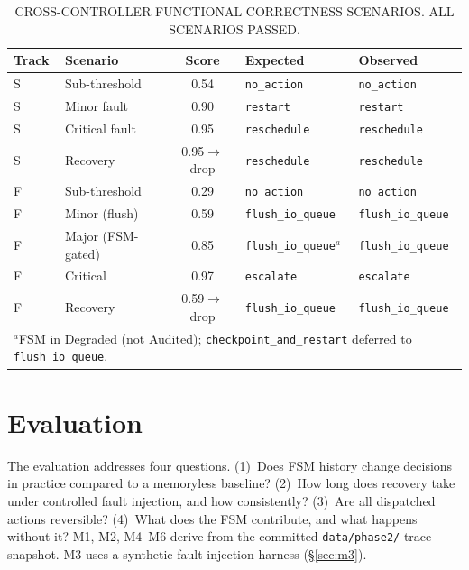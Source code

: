 \documentclass[conference]{IEEEtran}
\begin{document}
\begin{table}[!t]
\caption{CROSS-CONTROLLER FUNCTIONAL CORRECTNESS SCENARIOS. ALL SCENARIOS PASSED.}
\label{tab:scenarios}
\centering
\renewcommand{\arraystretch}{1.20}
\setlength{\tabcolsep}{7pt}
\begin{tabular}{llcll}
\hline
\textbf{Track} & \textbf{Scenario} & \textbf{Score} & \textbf{Expected} & \textbf{Observed} \\
\hline
S & Sub-threshold     & 0.54                  & \texttt{no\_action}           & \texttt{no\_action} \\
S & Minor fault       & 0.90                  & \texttt{restart}              & \texttt{restart} \\
S & Critical fault    & 0.95                  & \texttt{reschedule}           & \texttt{reschedule} \\
S & Recovery          & 0.95$\rightarrow$drop & \texttt{reschedule}           & \texttt{reschedule} \\
F & Sub-threshold     & 0.29                  & \texttt{no\_action}           & \texttt{no\_action} \\
F & Minor (flush)     & 0.59                  & \texttt{flush\_io\_queue}     & \texttt{flush\_io\_queue} \\
F & Major (FSM-gated) & 0.85                  & \texttt{flush\_io\_queue}$^{a}$ & \texttt{flush\_io\_queue} \\
F & Critical          & 0.97                  & \texttt{escalate}             & \texttt{escalate} \\
F & Recovery          & 0.59$\rightarrow$drop & \texttt{flush\_io\_queue}     & \texttt{flush\_io\_queue} \\
\hline
\multicolumn{5}{l}{\footnotesize $^{a}$FSM in Degraded (not Audited); \texttt{checkpoint\_and\_restart} deferred to \texttt{flush\_io\_queue}.}
\end{tabular}
\end{table}

\section{Evaluation}
\label{sec:eval}

The evaluation addresses four questions. (1)~Does FSM history change decisions in practice compared to a memoryless baseline? (2)~How long does recovery take under controlled fault injection, and how consistently? (3)~Are all dispatched actions reversible? (4)~What does the FSM contribute, and what happens without it? M1, M2, M4--M6 derive from the committed \texttt{data/phase2/} trace snapshot. M3 uses a synthetic fault-injection harness (§\ref{sec:m3}).
\end{document}
